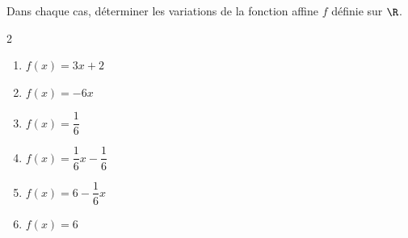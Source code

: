 \begin{exo}{}
	Dans chaque cas, déterminer les variations de la fonction affine $f$ définie sur $\R$.
	\vspace*{-2mm}
	\begin{multicols}{2}
	\begin{enumerate}
		\item $f(x) = 3x + 2$
		\item $f(x) = -6x$
		\item $f(x) = \dfrac{1}{6}$
		\item $f(x) = \dfrac{1}{6}x - \dfrac{1}{6}$
		\item $f(x) = 6 - \dfrac{1}{6}x$
		\item $f(x) = 6$
	\end{enumerate}
	\end{multicols}
\end{exo}
